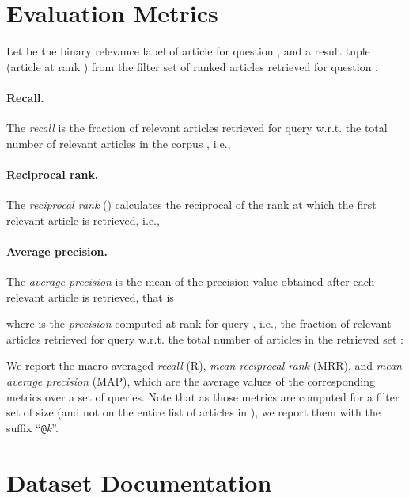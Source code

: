 \documentclass[11pt]{article}
\makeatletter
\newcommand{\at}{\texttt{@}}
\makeatother
\begin{document}
\section{Evaluation Metrics \label{app:evaluation_metrics}}
Let  be the binary relevance label of article  for question , and  a result tuple (article  at rank ) from the filter set  of ranked articles retrieved for question .

\paragraph{Recall.}
The \textit{recall}  is the fraction of relevant articles retrieved for query  w.r.t. the total number of relevant articles in the corpus , i.e.,


\paragraph{Reciprocal rank.}
The \textit{reciprocal rank} () calculates the reciprocal of the rank at which the first relevant article is retrieved, i.e.,


\paragraph{Average precision.}
The \textit{average precision}  is the mean of the precision value obtained after each relevant article is retrieved, that is

where  is the \textit{precision} computed at rank  for query , i.e., the fraction of relevant articles retrieved for query  w.r.t. the total number of articles in the retrieved set :


We report the macro-averaged \textit{recall} (R), \textit{mean reciprocal rank} (MRR), and \textit{mean average precision} (MAP), which are the average values of the corresponding metrics over a set of  queries. Note that as those metrics are computed for a filter set of size  (and not on the entire list of articles in ), we report them with the suffix ``\at\textit{k}''.


\section{Dataset Documentation}
\end{document}
